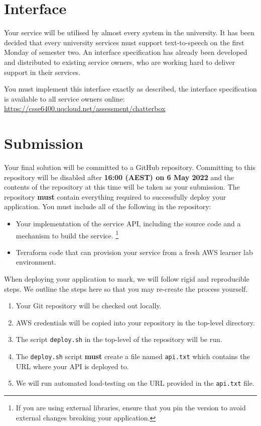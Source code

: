 \documentclass{csse4400}
\begin{document}


\section{Interface}
Your service will be utilised by almost every system in the university.
It has been decided that every university services must support text-to-speech on the first Monday of semester two.
An interface specification has already been developed and distributed to existing service owners,
who are working hard to deliver support in their services.

You must implement this interface exactly as described,
the interface specification is available to all service owners online:
\url{https://csse6400.uqcloud.net/assessment/chatterbox}

\section{Submission}
Your final solution will be committed to a GitHub repository.
Committing to this repository will be disabled after \textbf{16:00 (AEST) on 6 May 2022} and the contents of the repository at this time will be taken as your submission.
The repository \textbf{must} contain everything required to successfully deploy your application.
You must include all of the following in the repository:
\begin{itemize}
  \item Your implementation of the service API, including the source code and a mechanism to build the service.%
  \footnote{If you are using external libraries, ensure that you pin the version to avoid external changes breaking your application.}
  \item Terraform code that can provision your service from a fresh AWS learner lab environment.
\end{itemize}

When deploying your application to mark,
we will follow rigid and reproducible steps.
We outline the steps here so that you may re-create the process yourself.

\begin{enumerate}
  \item Your Git repository will be checked out locally.
  \item AWS credentials will be copied into your repository in the top-level directory.
  \item The script \texttt{deploy.sh} in the top-level of the repository will be run.
  \item The \texttt{deploy.sh} script \textbf{must} create a file named \texttt{api.txt} which contains the URL where your API is deployed to.
  \item We will run automated load-testing on the URL provided in the \texttt{api.txt} file.
\end{enumerate}
\end{document}

